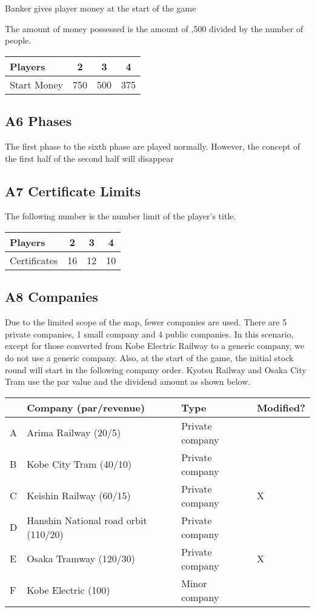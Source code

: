 \documentclass{article}
\begin{document}
\begin{CJK}{UTF8}{min}
Banker gives player money at the start of the game

The amount of money possessed is the amount of
,500 divided by the number of people.

\begin{tabular}{|l|c|c|c|}
\hline
Players & 2 & 3 & 4 \\
\hline
Start Money & 750 & 500 & 375 \\
\hline
\end{tabular}

\subsection*{A6 Phases}

The first phase to the sixth phase are played normally. However, the
concept of the first half of the second half will disappear

\subsection*{A7 Certificate Limits}

The following number is the number limit of the player's title.


\begin{tabular}{|l|c|c|c|}
\hline
Players & 2 & 3 & 4 \\
\hline
Certificates & 16 & 12 & 10 \\
\hline
\end{tabular}


\subsection*{A8 Companies}

Due to the limited scope of the map, fewer companies are used. There
are 5 private companies, 1 small company and 4 public companies. In
this scenario, except for those converted from Kobe Electric Railway
to a generic company, we do not use a generic company. Also, at the
start of the game, the initial stock round will start in the following
company order. Kyotsu Railway and Osaka City Tram use the par value
and the dividend amount as shown below.

\begin{tabular}{llll}
 & Company (par/revenue) & Type & Modified? \\
\hline
A & Arima Railway (20/5) & Private company & \\
B & Kobe City Tram (40/10) & Private company & \\
C & Keishin Railway (60/15) & Private company & X \\
D & Hanshin National road orbit (110/20) & Private company & \\
E & Osaka Tramway (120/30) & Private company & X \\
F & Kobe Electric (100) & Minor company & \\
\end{tabular}


\end{CJK}
\end{document}
